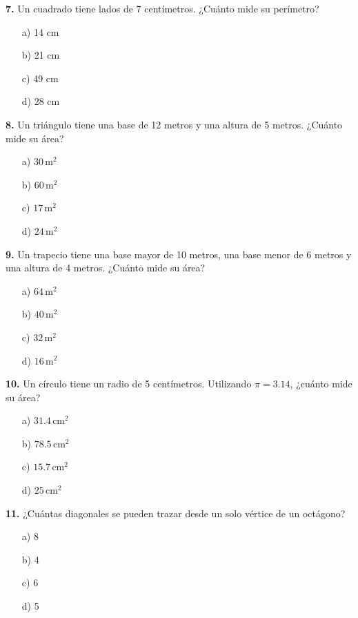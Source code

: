 \noindent\textbf{7.} Un cuadrado tiene lados de 7 centímetros. ¿Cuánto mide su perímetro?

\begin{itemize}
    \item[a)] 14 cm
    \item[b)] 21 cm
    \item[c)] 49 cm
    \item[d)] 28 cm
\end{itemize}


\noindent\textbf{8.} Un triángulo tiene una base de 12 metros y una altura de 5 metros. ¿Cuánto mide su área?

\begin{itemize}
    \item[a)] $30\,\text{m}^2$
    \item[b)] $60\,\text{m}^2$
    \item[c)] $17\,\text{m}^2$
    \item[d)] $24\,\text{m}^2$
\end{itemize}


\noindent\textbf{9.} Un trapecio tiene una base mayor de 10 metros, una base menor de 6 metros y una altura de 4 metros. ¿Cuánto mide su área?

\begin{itemize}
    \item[a)] $64\,\text{m}^2$
    \item[b)] $40\,\text{m}^2$
    \item[c)] $32\,\text{m}^2$
    \item[d)] $16\,\text{m}^2$
\end{itemize}


\noindent\textbf{10.} Un círculo tiene un radio de 5 centímetros. Utilizando $\pi=3.14$, ¿cuánto mide su área?

\begin{itemize}
    \item[a)] $31.4\,\text{cm}^2$
    \item[b)] $78.5\,\text{cm}^2$
    \item[c)] $15.7\,\text{cm}^2$
    \item[d)] $25\,\text{cm}^2$
\end{itemize}


\noindent\textbf{11.} ¿Cuántas diagonales se pueden trazar desde un solo vértice de un octágono?

\begin{itemize}
    \item[a)] 8
    \item[b)] 4
    \item[c)] 6
    \item[d)] 5
\end{itemize}


